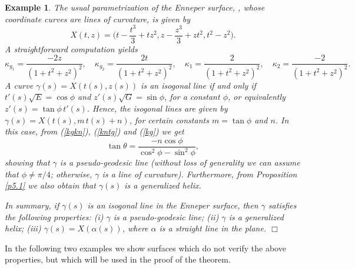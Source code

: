 \documentclass[11pt,a4paper]{article}
\def\g{\gamma}
\newtheorem{example}{Example}
\begin{document}
\begin{example}\label{ex2}
The usual parametrization of the \emph{Enneper surface}, \cite[p. 205]{DoCarmo76}, whose coordinate curves are lines of curvature, is given by
\begin{equation}\label{ParamtEnneper}
X(t,z)=\Big(t-\frac{t^3}{3}+tz^2,z-\frac{z^3}{3}+zt^2,t^2-z^2\Big).
\end{equation}
A straightforward computation yields
\[
\kappa_{g_1}=\frac{-2 z}{(1+t^2+z^2)^2},\quad \kappa_{g_2}=\frac{2t}{(1+t^2+z^2)^2},\quad \kappa_{1}=\frac{2}{(1+t^2+z^2)^2},\quad \kappa_{2}=\frac{-2}{(1+t^2+z^2)^2}.
\]
A curve $\gamma(s)=X(t(s),z(s))$ is an isogonal line if and only if $t'(s)\sqrt{E}=\cos\phi$ and $z'(s)\sqrt{G}= \sin\phi$, for a constant $\phi$, or equivalently $z'(s)=\tan\phi\,t'(s)$. Hence, the  isogonal lines are given by  $\gamma(s)=X(t(s),m\,t(s)+n)$, for certain constants $m=\tan\phi$ and $n$. In this case, from (\ref{kgkn}), (\ref{kntg}) and (\ref{kg}) %
we get
\[
\tan\theta= \frac{-n\cos\phi}{\cos^2\phi-\sin^2\phi},
\]
showing that $\gamma$ is a pseudo-geodesic line (without loss of generality we can assume that $\phi\neq\pi/4$; otherwise, $\g$ is a line of curvature). Furthermore, from Proposition \ref{p5.1} we also obtain that $\g(s)$ is a generalized helix.

In summary, if $\gamma(s)$ is an isogonal line in the Enneper surface, then $\g$ satisfies the following properties: (i) $\gamma$ is a pseudo-geodesic line; (ii) $\g$ is a generalized helix; (iii) $\g(s)=X(\alpha(s))$, where $\alpha$ is a straight line in the plane.
\hfill$\Box$
\end{example}

In the following two examples we show surfaces which do not verify the above properties, but which will be used in the proof of the theorem.
\end{document}
